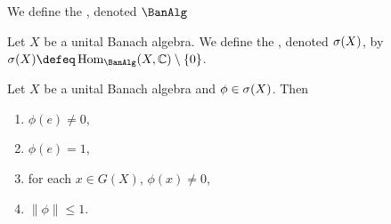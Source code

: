 \documentclass{book}
\begin{document}
	\begin{defn}
		We define the , denoted $\BanAlg$
	\end{defn}

	\begin{defn}
		Let $X$ be a unital Banach algebra. We define the , denoted $\sigma(X)$, by $\sig(X) \defeq \Hom_{\BanAlg}(X, \C) \setminus \{0\}$.
	\end{defn}

	\begin{ex}
		Let $X$ be a unital Banach algebra and $\phi \in \sigma(X)$. Then 
		\begin{enumerate}
			\item $\phi(e) \neq 0$,
			\item $\phi(e) = 1$,
			\item for each $x \in G(X)$, $\phi(x) \neq 0$,
			\item $\|\phi\| \leq 1$.
		\end{enumerate}
	\end{ex}
\end{document}
